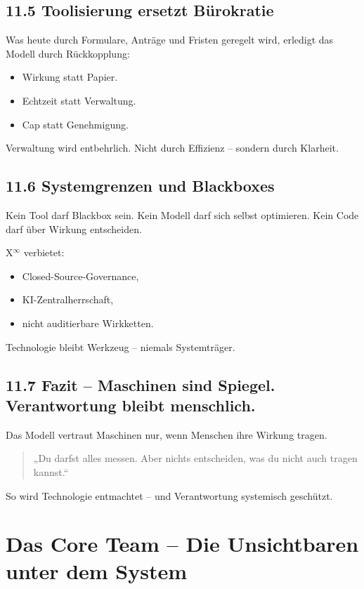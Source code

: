 \documentclass[12pt,a4paper]{book}
\begin{document}
\section*{11.5 Toolisierung ersetzt Bürokratie}

Was heute durch Formulare, Anträge und Fristen geregelt wird,  
erledigt das Modell durch Rückkopplung:

\begin{itemize}
    \item Wirkung statt Papier.
    \item Echtzeit statt Verwaltung.
    \item Cap statt Genehmigung.
\end{itemize}

Verwaltung wird entbehrlich.  
Nicht durch Effizienz – sondern durch Klarheit.

\section*{11.6 Systemgrenzen und Blackboxes}

Kein Tool darf Blackbox sein.  
Kein Modell darf sich selbst optimieren.  
Kein Code darf über Wirkung entscheiden.

X$^\infty$ verbietet:

\begin{itemize}
    \item Closed-Source-Governance,
    \item KI-Zentralherrschaft,
    \item nicht auditierbare Wirkketten.
\end{itemize}

Technologie bleibt Werkzeug –  
niemals Systemträger.

\section*{11.7 Fazit – Maschinen sind Spiegel. Verantwortung bleibt menschlich.}

Das Modell vertraut Maschinen nur,  
wenn Menschen ihre Wirkung tragen.

\begin{quote}
„Du darfst alles messen.  
Aber nichts entscheiden,  
was du nicht auch tragen kannst.“  
\end{quote}

So wird Technologie entmachtet –  
und Verantwortung systemisch geschützt.

\chapter{Das Core Team – Die Unsichtbaren unter dem System}
\end{document}
